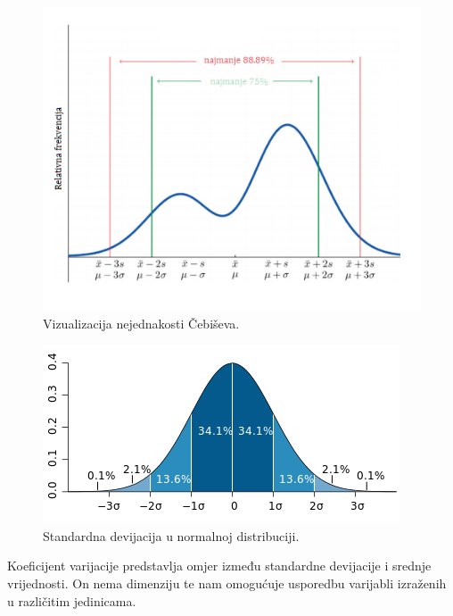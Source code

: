 \documentclass[times,utf8,zavrsni]{fer}
\begin{document}
\begin{figure}[]
	\centering
	\includegraphics[width=\columnwidth]{img/cebisev.png}
	\caption{Vizualizacija nejednakosti Čebiševa.\protect\footnotemark }
	\label{fig:cebisev}
\end{figure}


\begin{figure}[]
	\centering
	\includegraphics[width=\columnwidth]{img/deviation.png}
	\caption{Standardna devijacija u normalnoj distribuciji.\protect\footnotemark}
	\label{fig:deviation}
\end{figure}

Koeficijent varijacije predstavlja omjer između standardne devijacije i srednje vrijednosti. On nema dimenziju te nam omogućuje usporedbu varijabli izraženih u različitim jedinicama.
\end{document}
